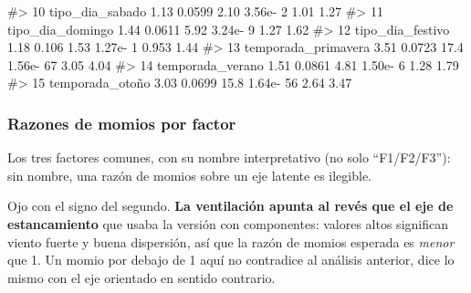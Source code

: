 \documentclass[
  spanish,
  letterpaper,
  DIV=11,
  numbers=noendperiod]{scrartcl}
\newenvironment{Shaded}{\begin{snugshade}}{\end{snugshade}}
\newcommand{\CommentTok}[1]{\textcolor[rgb]{0.37,0.37,0.37}{#1}}
\begin{document}
\begin{Shaded}
\begin{Highlighting}[]
\CommentTok{\#\textgreater{} 10 tipo\_dia\_sabado        1.13     0.0599      2.10 3.56e{-}  2    1.01      1.27 }
\CommentTok{\#\textgreater{} 11 tipo\_dia\_domingo       1.44     0.0611      5.92 3.24e{-}  9    1.27      1.62 }
\CommentTok{\#\textgreater{} 12 tipo\_dia\_festivo       1.18     0.106       1.53 1.27e{-}  1    0.953     1.44 }
\CommentTok{\#\textgreater{} 13 temporada\_primavera    3.51     0.0723     17.4  1.56e{-} 67    3.05      4.04 }
\CommentTok{\#\textgreater{} 14 temporada\_verano       1.51     0.0861      4.81 1.50e{-}  6    1.28      1.79 }
\CommentTok{\#\textgreater{} 15 temporada\_otoño        3.03     0.0699     15.8  1.64e{-} 56    2.64      3.47}
\end{Highlighting}
\end{Shaded}

\subsubsection{Razones de momios por
factor}\label{razones-de-momios-por-factor}

Los tres factores comunes, con su nombre interpretativo (no solo
``F1/F2/F3''): sin nombre, una razón de momios sobre un eje latente es
ilegible.

Ojo con el signo del segundo. \textbf{La ventilación apunta al revés que
el eje de estancamiento} que usaba la versión con componentes: valores
altos significan viento fuerte y buena dispersión, así que la razón de
momios esperada es \emph{menor} que 1. Un momio por debajo de 1 aquí no
contradice al análisis anterior, dice lo mismo con el eje orientado en
sentido contrario.
\end{document}
